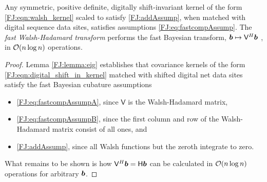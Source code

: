 \documentclass[graybox,footinfo]{svmult}
\begin{document}
\begin{theorem} \label{FJ:thm:main}
	Any symmetric, positive definite, digitally shift-invariant kernel of the form \eqref{FJ:eqn:walsh_kernel} scaled to satisfy \eqref{FJ:addAssump}, when matched with digital sequence data sites, satisfies assumptions \eqref{FJ:eq:fastcompAssump}.  The \emph{fast Walsh-Hadamard transform} performs the fast Bayesian transform,  ${\boldsymbol{b}} \mapsto \mathsf{V}^H {\boldsymbol{b}}$ , in ${\mathcal{O}}(n \log n)$ operations.
\end{theorem}

\begin{proof}{
Lemma \ref{FJ:lemma:eig} establishes that covariance kernels of the form \eqref{FJ:eqn:digital_shift_in_kernel} matched with shifted digital net data sites satisfy the fast Bayesian cubature assumptions
\begin{itemize}
    \item \eqref{FJ:eq:fastcompAssumpA}, since $\mathsf{V}$ is the Walsh-Hadamard matrix,
    
    \item  \eqref{FJ:eq:fastcompAssumpB}, since the first column and row of the  Walsh-Hadamard matrix consist of all ones, and
    
    \item \eqref{FJ:addAssump}, since all Walsh functions but the zeroth integrate to zero.
\end{itemize}
What remains to be shown is how $\mathsf{V}^H {\boldsymbol{b}} = \mathsf{H} {\boldsymbol{b}}$ can be calculated in ${\mathcal{O}}(n \log{n})$ operations for arbitrary ${\boldsymbol{b}}$.

}
\end{proof}
\end{document}

